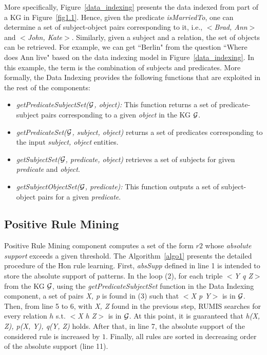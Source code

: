 More specifically, Figure~\ref{data_indexing} presents the data indexed from part of a KG in Figure~\ref{fig1.1}. Hence, given the predicate \textit{isMarriedTo}, one can determine a set of subject-object pairs corresponding to it, i.e., \textit{$<$Brad, Ann$>$} and \textit{$<$John, Kate$>$}. Similarly, given a subject and a relation, the set of objects can be retrieved. For example, we can get ``Berlin" from the question ``Where does Ann live" based on the data indexing model in Figure~\ref{data_indexing}. In this example, the term is the combination of subjects and predicates. More formally, the Data Indexing provides the following functions that are exploited in the rest of the components:

\begin{itemize}
\item \textit{getPredicateSubjectSet($\mathcal{G}$, object):} This function returns a set of predicate-subject pairs corresponding to a given \textit{object} in the KG $\mathcal{G}$.
\item \textit{getPredicateSet($\mathcal{G}$, subject, object)} returns a set of predicates corresponding to the input \textit{subject, object} entities.
\item \textit{getSubjectSet($\mathcal{G}$, predicate, object)} retrieves a set of subjects for given \textit{predicate} and\textit{ object}.
\item \textit{getSubjectObjectSet($\mathcal{G}$, predicate):} This function outputs a set of subject-object pairs for a given \textit{predicate}.
\end{itemize}

\subsection{Positive Rule Mining}

Positive Rule Mining component computes a set of the form $r2$ whose \textit{absolute support} exceeds a given threshold. The Algorithm~\ref{algo1} presents the detailed procedure of the Hon rule learning. First, \textit{absSupp} defined in line 1 is intended to store the absolute support of patterns. In the loop (2), for each triple \textit{$<$Y q Z$>$} from the KG $\mathcal{G}$, using the \textit{getPredicateSubjectSet} function in the Data Indexing component, a set of pairs \textit{X, p} is found in (3) such that \textit{$<$X p Y$>$} is in $\mathcal{G}$. Then, from line 5 to 6, with \textit{X, Z} found in the previous step, RUMIS searches for every relation $h$ s.t. \textit{$<$X h Z$>$} is in $\mathcal{G}$. At this point, it is guaranteed that \textit{h(X, Z), p(X, Y), q(Y, Z)} holds. After that, in line 7, the absolute support of the considered rule is increased by $1$. Finally, all rules are sorted in decreasing order of the absolute support (line 11).

